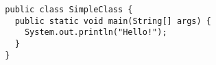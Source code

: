 \documentclass{report}
\begin{document}
\begin{lstlisting}
  public class SimpleClass {
    public static void main(String[] args) {
      System.out.println("Hello!");
    }
  }
\end{lstlisting}
\end{document}
